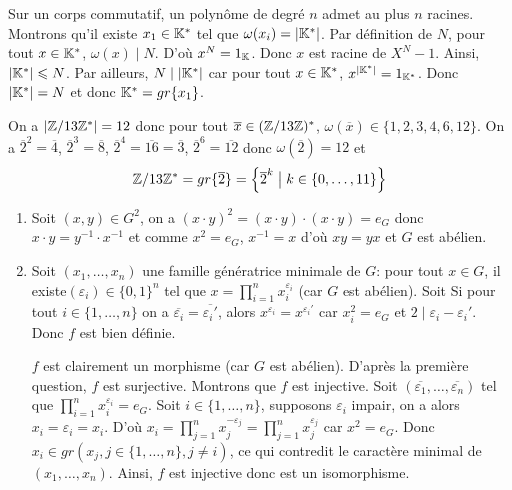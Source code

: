 \begin{solution}
	Sur un corps commutatif, un polynôme de degré $n$ admet au plus $n$ racines. Montrons qu'il existe $x_{1}\in\mathbb{K}^{*}$ tel que $\omega(x_{i})=\vert\mathbb{K}^{*}\vert$. Par définition de $N$, pour tout $x\in\mathbb{K}^{*}$, $\omega(x)\mid N$. D'où $x^{N}=1_{\mathbb{K}}$. Donc $x$ est racine de $X^{N}-1$. Ainsi, $\vert\mathbb{K}^{*}\vert\leqslant N$. Par ailleurs, $N\mid\vert\mathbb{K}^{*}\vert$ car pour tout $x\in\mathbb{K}^{*}$, $x^{\vert\mathbb{K}^{*}\vert}=1_{\mathbb{K}^{*}}$. Donc $\vert\mathbb{K}^{*}\vert=N$ et donc $\mathbb{K}^{*}=gr\{x_{1}\}$.

	On a $\vert\mathbb{Z}/13\mathbb{Z}^{*}\vert=12$ donc pour tout $\overline{x}\in(\mathbb{Z}/13\mathbb{Z})^{*}$, $\omega(\overline{x})\in\{1,2,3,4,6,12\}$. On a $\overline{2}^{2}=\overline{4}$, $\overline{2}^{3}=\overline{8}$, $\overline{2}^{4}=\overline{16}=\overline{3}$, $\overline{2}^{6}=\overline{12}$ donc $\omega(\overline{2})=12$ et 
	$$\mathbb{Z}/13\mathbb{Z}^{*}=gr\{\overline{2}\}=\Bigl\{\overline{2}^{k}\bigm| k\in\{0,\dots,11\}\Bigr\}$$
\end{solution}

\begin{solution}
	\phantom{}
	\begin{enumerate}
		\item Soit $(x,y)\in G^{2}$, on a $(x\cdot y)^{2}=(x\cdot y)\cdot (x\cdot y)=e_{G}$ donc $x\cdot y=y^{-1}\cdot x^{-1}$ et comme $x^{2}=e_{G}$, $x^{-1}=x$ d'où $xy=yx$ et $G$ est abélien.
		
		\item Soit $(x_{1},\dots,x_{n})$ une famille génératrice minimale de $G$: pour tout $x\in G$, il existe$(\varepsilon_{i})\in\{0,1\}^{n}$ tel que $x=\prod_{i=1}^{n}x_{i}^{\varepsilon_{i}}$ (car $G$ est abélien).
		Soit 
		Si pour tout $i\in\{1,\dots,n\}$ on a $\overline{\varepsilon_{i}}=\overline{\varepsilon_{i}'}$, alors $x^{\varepsilon_{i}}=x^{\varepsilon_{i}'}$ car $x_{i}^{2}=e_{G}$ et $2\mid\varepsilon_{i}-\varepsilon_{i}'$. Donc $f$ est bien définie.

		$f$ est clairement un morphisme (car $G$ est abélien). D'après la première question, $f$ est surjective. Montrons que $f$ est injective. Soit $(\overline{\varepsilon_{1}},\dots,\overline{\varepsilon_{n}})$ tel que $\prod_{i=1}^{n}x_{i}^{\varepsilon_{i}}=e_{G}$. Soit $i\in\{1,\dots,n\}$, supposons $\varepsilon_{i}$ impair, on a alors $x_{i}=\varepsilon_{i}=x_{i}$. D'où $x_{i}=\prod_{j=1}^{n}x_{j}^{-\varepsilon_{j}}=\prod_{j=1}^{n}x_{j}^{\varepsilon_{j}}$ car $x^{2}=e_{G}$. Donc $x_{i}\in gr(x_{j},j\in\{1,\dots,n\}, j\neq i)$, ce qui contredit le caractère minimal de $(x_{1},\dots,x_{n})$. Ainsi, $f$ est injective donc est un isomorphisme.
	\end{enumerate}
\end{solution}

